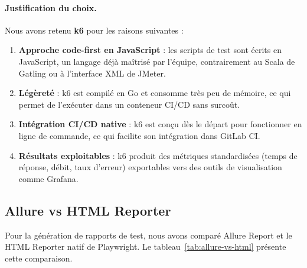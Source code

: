 \paragraph{Justification du choix.}
Nous avons retenu \textbf{k6} pour les raisons suivantes :
\begin{enumerate}[nosep]
    \item \textbf{Approche code-first en JavaScript} : les scripts de test sont écrits en JavaScript, un langage déjà maîtrisé par l'équipe, contrairement au Scala de Gatling ou à l'interface XML de JMeter.
    \item \textbf{Légèreté} : k6 est compilé en Go et consomme très peu de mémoire, ce qui permet de l'exécuter dans un conteneur CI/CD sans surcoût.
    \item \textbf{Intégration CI/CD native} : k6 est conçu dès le départ pour fonctionner en ligne de commande, ce qui facilite son intégration dans GitLab CI.
    \item \textbf{Résultats exploitables} : k6 produit des métriques standardisées (temps de réponse, débit, taux d'erreur) exportables vers des outils de visualisation comme Grafana.
\end{enumerate}

\subsection{Allure vs HTML Reporter}
\label{subsec:allure-vs-html}

Pour la génération de rapports de test, nous avons comparé Allure Report et le HTML Reporter natif de Playwright. Le tableau~\ref{tab:allure-vs-html} présente cette comparaison.

